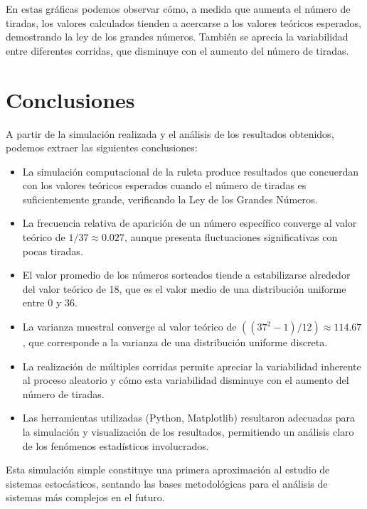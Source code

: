 \documentclass{article}
\begin{document}
En estas gráficas podemos observar cómo, a medida que aumenta el número de tiradas, los valores calculados tienden a acercarse a los valores teóricos esperados, demostrando la ley de los grandes números. También se aprecia la variabilidad entre diferentes corridas, que disminuye con el aumento del número de tiradas.
\section{Conclusiones}
A partir de la simulación realizada y el análisis de los resultados obtenidos, podemos extraer las siguientes conclusiones:

\begin{itemize}
    \item La simulación computacional de la ruleta produce resultados que concuerdan con los valores teóricos esperados cuando el número de tiradas es suficientemente grande, verificando la Ley de los Grandes Números.
    
    \item La frecuencia relativa de aparición de un número específico converge al valor teórico de $1/37 \approx 0.027$, aunque presenta fluctuaciones significativas con pocas tiradas.
    
    \item El valor promedio de los números sorteados tiende a estabilizarse alrededor del valor teórico de 18, que es el valor medio de una distribución uniforme entre 0 y 36.
    
    \item La varianza muestral converge al valor teórico de $((37^2-1)/12) \approx 114.67$, que corresponde a la varianza de una distribución uniforme discreta.
    
    \item La realización de múltiples corridas permite apreciar la variabilidad inherente al proceso aleatorio y cómo esta variabilidad disminuye con el aumento del número de tiradas.
    
    \item Las herramientas utilizadas (Python, Matplotlib) resultaron adecuadas para la simulación y visualización de los resultados, permitiendo un análisis claro de los fenómenos estadísticos involucrados.
\end{itemize}

Esta simulación simple constituye una primera aproximación al estudio de sistemas estocásticos, sentando las bases metodológicas para el análisis de sistemas más complejos en el futuro.
\end{document}
